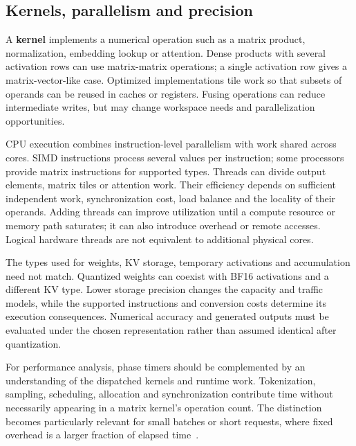 \subsection{Kernels, parallelism and precision}

A \textbf{kernel} implements a numerical operation such as a matrix
product, normalization, embedding lookup or attention.  Dense products
with several activation rows can use matrix-matrix operations; a
single activation row gives a matrix-vector-like case.  Optimized
implementations tile work so that subsets of operands can be reused in
caches or registers.  Fusing operations can reduce intermediate writes,
but may change workspace needs and parallelization opportunities.

CPU execution combines instruction-level parallelism with work shared
across cores.  SIMD instructions process several values per instruction;
some processors provide matrix instructions for supported types.
Threads can divide output elements, matrix tiles or attention work.
Their efficiency depends on sufficient independent work, synchronization
cost, load balance and the locality of their operands.  Adding threads
can improve utilization until a compute resource or memory path
saturates; it can also introduce overhead or remote accesses.  Logical
hardware threads are not equivalent to additional physical cores.

The types used for weights, KV storage, temporary activations and
accumulation need not match.  Quantized weights can coexist with BF16
activations and a different KV type.  Lower storage precision changes
the capacity and traffic models, while the supported instructions and
conversion costs determine its execution consequences.  Numerical
accuracy and generated outputs must be evaluated under the chosen
representation rather than assumed identical after quantization.

For performance analysis, phase timers should be complemented by an
understanding of the dispatched kernels and runtime work.  Tokenization,
sampling, scheduling, allocation and synchronization contribute time
without necessarily appearing in a matrix kernel's operation count.
The distinction becomes particularly relevant for small batches or
short requests, where fixed overhead is a larger fraction of elapsed
time~\cite{na2024llmcpu}.
